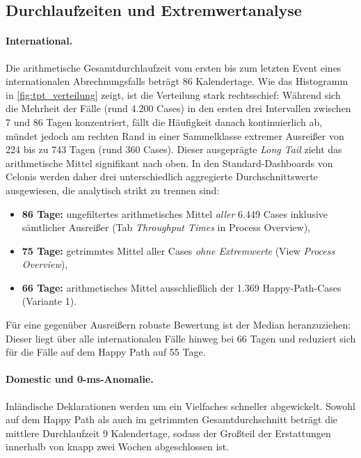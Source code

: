 \subsection{Durchlaufzeiten und Extremwertanalyse}
\label{sec:durchlaufzeiten}

\paragraph{International.} Die arithmetische Gesamtdurchlaufzeit vom ersten bis zum letzten Event eines internationalen Abrechnungsfalls beträgt 86 Kalendertage.
Wie das Histogramm in \autoref{fig:tpt_verteilung} zeigt, ist die Verteilung stark rechtsschief: Während sich die Mehrheit der Fälle (rund 4.200 Cases) in den
ersten drei Intervallen zwischen 7 und 86 Tagen konzentriert, fällt die Häufigkeit danach kontinuierlich ab, mündet jedoch am rechten Rand in einer Sammelklasse
extremer Ausreißer von 224 bis zu 743 Tagen (rund 360 Cases). Dieser ausgeprägte \textit{Long Tail} zieht das arithmetische Mittel signifikant nach oben.
In den Standard-Dashboards von Celonis werden daher drei unterschiedlich aggregierte Durchschnittswerte ausgewiesen, die analytisch strikt zu trennen sind:

\begin{itemize}[noitemsep]
	\item \textbf{86 Tage:} ungefiltertes arithmetisches Mittel \emph{aller} 6.449 Cases inklusive sämtlicher Ausreißer (Tab \textit{Throughput Times} in Process Overview),
	\item \textbf{75 Tage:} getrimmtes Mittel aller Cases \emph{ohne Extremwerte} (View \textit{Process Overview}),
	\item \textbf{66 Tage:} arithmetisches Mittel ausschließlich der 1.369 Happy-Path-Cases (Variante 1).
\end{itemize}

Für eine gegenüber Ausreißern robuste Bewertung ist der Median heranzuziehen:
Dieser liegt über alle internationalen Fälle hinweg bei 66 Tagen und reduziert sich für die Fälle auf dem Happy Path auf 55 Tage.

\paragraph{Domestic und 0-ms-Anomalie.} Inländische Deklarationen werden um ein Vielfaches schneller abgewickelt. Sowohl auf dem Happy Path als
auch im getrimmten Gesamtdurchschnitt beträgt die mittlere Durchlaufzeit 9 Kalendertage, sodass der Großteil der Erstattungen innerhalb von knapp
zwei Wochen abgeschlossen ist.

